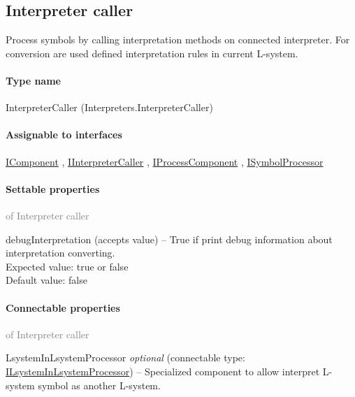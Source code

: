 

\subsection{Interpreter caller}
\label{Malsys.Processing.Components.Interpreters.InterpreterCaller}
Process symbols by calling interpretation methods on connected interpreter.
            For conversion are used defined interpretation rules in current L-system.\paragraph{Type name}
InterpreterCaller (Interpreters.InterpreterCaller) 	\paragraph{Assignable to interfaces}
		\hyperref[Malsys.Processing.Components.IComponent]{IComponent}%
, 		\hyperref[Malsys.Processing.Components.IInterpreterCaller]{IInterpreterCaller}%
, 		\hyperref[Malsys.Processing.Components.IProcessComponent]{IProcessComponent}%
, 		\hyperref[Malsys.Processing.Components.ISymbolProcessor]{ISymbolProcessor}%
	\paragraph{Settable properties}\textcolor{gray}{of Interpreter caller}
	\begin{description*}
		\item[debugInterpretation]
		(accepts value)
			-- True if print debug information about interpretation converting.
			\\ Expected value: true or false
			\\ Default value: false
	\end{description*}
	\paragraph{Connectable properties}\textcolor{gray}{of Interpreter caller}
	\begin{description*}
		\item[LsystemInLsystemProcessor]
 \textit{optional} 		(connectable type:  \hyperref[Malsys.Processing.Components.Common.ILsystemInLsystemProcessor]{ILsystemInLsystemProcessor})
			-- Specialized component to allow interpret L-system symbol as another L-system.
	\end{description*}
	
